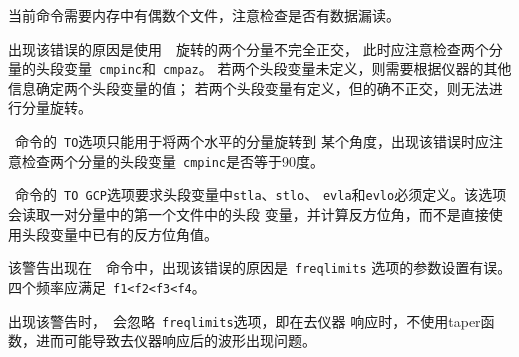 当前命令需要内存中有偶数个文件，注意检查是否有数据漏读。

出现该错误的原因是使用~~旋转的两个分量不完全正交，
此时应注意检查两个分量的头段变量~\verb+cmpinc+和~\verb+cmpaz+。
若两个头段变量未定义，则需要根据仪器的其他信息确定两个头段变量的值；
若两个头段变量有定义，但的确不正交，则无法进行分量旋转。

~命令的~\verb+TO+选项只能用于将两个水平的分量旋转到
某个角度，出现该错误时应注意检查两个分量的头段变量~\verb+cmpinc+是否等于90度。

~命令的~\verb+TO GCP+选项要求头段变量中\verb+stla+、\verb+stlo+、
\verb+evla+和\verb+evlo+必须定义。该选项会读取一对分量中的第一个文件中的头段
变量，并计算反方位角，而不是直接使用头段变量中已有的反方位角值。

该警告出现在~~命令中，出现该错误的原因是~\verb+freqlimits+
选项的参数设置有误。四个频率应满足~\verb+f1<f2<f3<f4+。

出现该警告时，~会忽略~\verb+freqlimits+选项，即在去仪器
响应时，不使用taper函数，进而可能导致去仪器响应后的波形出现问题。
